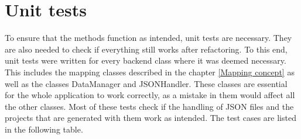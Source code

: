 \section{Unit tests}
To ensure that the methods function as intended, unit tests are necessary. They are also needed to check if everything still works after refactoring. To this end, unit tests were written for every backend class where it was deemed necessary. This includes the mapping classes described in the chapter \ref{Mapping concept} as well as the classes DataManager and JSONHandler. These classes are essential for the whole application to work correctly, as a mistake in them would affect all the other classes. Most of these tests check if the handling of JSON files and the projects that are generated with them work as intended. The test cases are listed in the following table.
\\ \\
